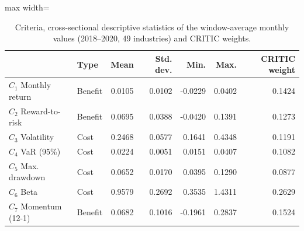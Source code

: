 \begin{table}[!htbp]
\centering
\footnotesize
\caption{Criteria, cross-sectional descriptive statistics of the window-average monthly values (2018--2020, 49 industries) and CRITIC weights.}\label{tab:criteria}
\begin{adjustbox}{max width=\textwidth}
\begin{tabular}{llrrrrr}
\toprule
 & Type & Mean & Std. dev. & Min. & Max. & CRITIC weight \\
\midrule
$C_1$ Monthly return & Benefit & 0.0105 & 0.0102 & -0.0229 & 0.0402 & 0.1424 \\
$C_2$ Reward-to-risk & Benefit & 0.0695 & 0.0388 & -0.0420 & 0.1391 & 0.1273 \\
$C_3$ Volatility & Cost & 0.2468 & 0.0577 & 0.1641 & 0.4348 & 0.1191 \\
$C_4$ VaR (95\%) & Cost & 0.0224 & 0.0051 & 0.0151 & 0.0407 & 0.1082 \\
$C_5$ Max. drawdown & Cost & 0.0652 & 0.0170 & 0.0395 & 0.1290 & 0.0877 \\
$C_6$ Beta & Cost & 0.9579 & 0.2692 & 0.3535 & 1.4311 & 0.2629 \\
$C_7$ Momentum (12-1) & Benefit & 0.0682 & 0.1016 & -0.1961 & 0.2837 & 0.1524 \\
\bottomrule
\end{tabular}
\end{adjustbox}
\end{table}
